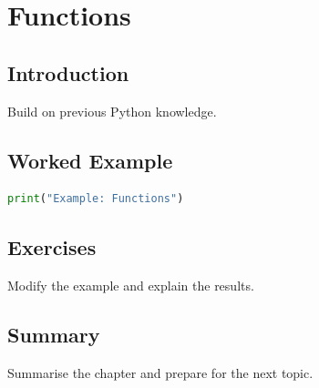 \chapter{Functions}
\label{chap:vol3-8}


\section{Introduction}
Build on previous Python knowledge.

\section{Worked Example}
\begin{lstlisting}[language=Python]
print("Example: Functions")
\end{lstlisting}

\section{Exercises}
\begin{exercise}
Modify the example and explain the results.
\end{exercise}

\section{Summary}
Summarise the chapter and prepare for the next topic.
